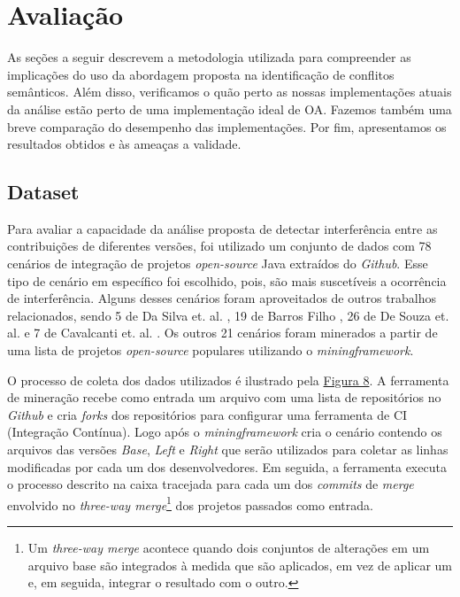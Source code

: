 \section{Avaliação}

As seções a seguir descrevem a metodologia utilizada para compreender as implicações do uso da abordagem proposta na identificação de conflitos semânticos. Além disso, verificamos o quão perto as nossas implementações atuais da análise estão perto de uma implementação ideal de OA. Fazemos também uma breve comparação do desempenho das implementações. Por fim, apresentamos os resultados obtidos e às ameaças a validade.

\subsection{Dataset}
Para avaliar a capacidade da análise proposta de detectar interferência entre as contribuições de diferentes versões, foi utilizado um conjunto de dados com 78 cenários de integração de projetos \emph{open-source} Java extraídos do \emph{Github}.  Esse tipo de cenário em específico foi escolhido, pois, são mais suscetíveis a ocorrência de interferência. Alguns desses cenários foram aproveitados de outros trabalhos relacionados, sendo 5 de Da Silva et. al. \cite{LeusonSilva2020}, 19 de Barros Filho  \cite{InformationFlowRoberto}, 26 de De Souza et. al. \cite{10.1145/958160.958177} e 7 de Cavalcanti et. al. \cite{10.1109/ASE.2019.00097}. Os outros 21 cenários foram minerados a partir de uma lista de projetos \emph{open-source} populares utilizando o \emph{miningframework}. 

O processo de coleta dos dados utilizados é ilustrado pela \hyperref[fig:mineracao]{Figura 8}. A ferramenta de mineração recebe como entrada um arquivo com uma lista de repositórios no \emph{Github} e cria \emph{forks} dos repositórios para configurar uma ferramenta de CI (Integração Contínua). Logo após o \emph{miningframework} cria o cenário contendo os arquivos das versões \emph{Base}, \emph{Left} e \emph{Right} que serão utilizados para coletar as linhas modificadas por cada um dos desenvolvedores. Em seguida, a ferramenta executa o processo descrito na caixa tracejada para cada um dos \emph{commits} de \emph{merge} envolvido no \emph{three-way merge}\footnote{Um  \emph{three-way merge} acontece quando dois conjuntos de alterações em um arquivo base são integrados à medida que são aplicados, em vez de aplicar um e, em seguida, integrar o resultado com o outro.} dos projetos passados como entrada. 

